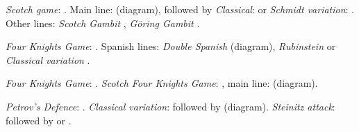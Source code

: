 \hspace{5mm}
\begin{minipage}[t]{.175\linewidth}
\raggedright
\begin{center}
\scalebox{.560}{\showboard}
\end{center}
\newgame
\emph{Scotch game}: .
Main line:  (diagram), followed by \emph{Classical}:  or \emph{Schmidt variation}: .
Other lines: \emph{Scotch Gambit} , \emph{Göring Gambit} .
\vspace{2mm}
\end{minipage}
\newline
\begin{minipage}[t]{.175\linewidth}
\raggedright
\begin{center}
\scalebox{.560}{\showboard}
\end{center}
\newgame
\emph{Four Knights Game}: .
Spanish lines: \emph{Double Spanish}  (diagram), \emph{Rubinstein}  or \emph{Classical variation} .
\vspace{2mm}
\end{minipage}
\hspace{5mm}
\begin{minipage}[t]{.175\linewidth}
\raggedright
\begin{center}
\scalebox{.560}{\showboard}
\end{center}
\newgame
\emph{Four Knights Game}: .
\emph{Scotch Four Knights Game}: , main line:  (diagram).
\vspace{2mm}
\end{minipage}
\hspace{5mm}
\begin{minipage}[t]{.175\linewidth}
\raggedright
\begin{center}
\scalebox{.560}{\showboard}
\end{center}
\newgame
\emph{Petrov's Defence}: .
\emph{Classical variation}:  followed by  (diagram).
\emph{Steinitz attack}:  followed by  or .
\vspace{2mm}
\end{minipage}
